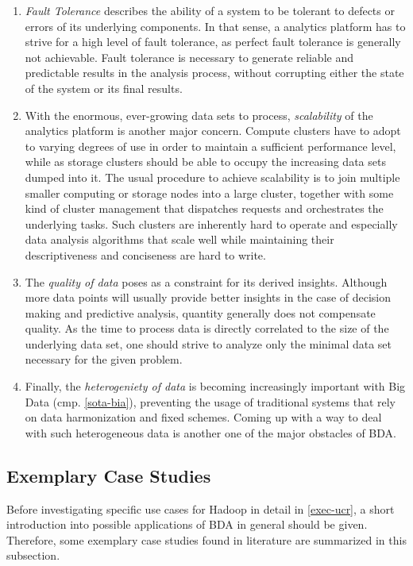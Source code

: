 \begin{enumerate}
    \item \emph{Fault Tolerance} describes the ability of a system to be tolerant to defects or errors of its underlying components. In that sense, a analytics platform has to strive for a high level of fault tolerance, as perfect fault tolerance is generally not achievable. Fault tolerance is necessary to generate reliable and predictable results in the analysis process, without corrupting either the state of the system or its final results.
    \item With the enormous, ever-growing data sets to process, \emph{scalability} of the analytics platform is another major concern. Compute clusters have to adopt to varying degrees of use in order to maintain a sufficient performance level, while as storage clusters should be able to occupy the increasing data sets dumped into it. The usual procedure to achieve scalability is to join multiple smaller computing or storage nodes into a large cluster, together with some kind of cluster management that dispatches requests and orchestrates the underlying tasks. Such clusters are inherently hard to operate and especially data analysis algorithms that scale well while maintaining their descriptiveness and conciseness are hard to write.
    \item The \emph{quality of data} poses as a constraint for its derived insights. Although more data points will usually provide better insights in the case of decision making and predictive analysis, quantity generally does not compensate quality. As the time to process data is directly correlated to the size of the underlying data set, one should strive to analyze only the minimal data set necessary for the given problem.
    \item Finally, the \emph{heterogeniety of data} is becoming increasingly important with Big Data (cmp. \autoref{sota-bia}), preventing the usage of traditional systems that rely on data harmonization and fixed schemes. Coming up with a way to deal with such heterogeneous data is another one of the major obstacles of \ac{BDA}.
\end{enumerate}

\subsection{Exemplary Case Studies}
\label{sota-bda-use-cases}

Before investigating specific use cases for Hadoop in detail in \autoref{exec-ucr}, a short introduction into possible applications of \ac{BDA} in general should be given. Therefore, some exemplary case studies found in literature are summarized in this subsection.

